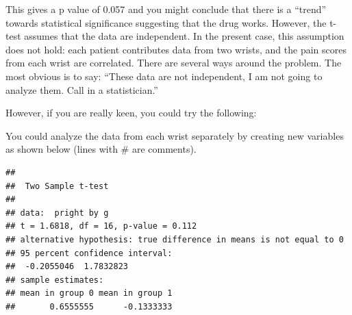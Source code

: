 \documentclass[]{book}
\newenvironment{Shaded}{\begin{snugshade}}{\end{snugshade}}
\newcommand{\CommentTok}[1]{\textcolor[rgb]{0.56,0.35,0.01}{\textit{#1}}}
\newcommand{\DataTypeTok}[1]{\textcolor[rgb]{0.13,0.29,0.53}{#1}}
\newcommand{\DecValTok}[1]{\textcolor[rgb]{0.00,0.00,0.81}{#1}}
\newcommand{\KeywordTok}[1]{\textcolor[rgb]{0.13,0.29,0.53}{\textbf{#1}}}
\newcommand{\NormalTok}[1]{#1}
\newcommand{\OperatorTok}[1]{\textcolor[rgb]{0.81,0.36,0.00}{\textbf{#1}}}
\newcommand{\OtherTok}[1]{\textcolor[rgb]{0.56,0.35,0.01}{#1}}
\newcommand{\StringTok}[1]{\textcolor[rgb]{0.31,0.60,0.02}{#1}}
\begin{document}
This gives a p value of 0.057 and you might conclude that there is a
``trend'' towards statistical significance suggesting that the drug
works. However, the t-test assumes that the data are independent. In the
present case, this assumption does not hold: each patient contributes
data from two wrists, and the pain scores from each wrist are
correlated. There are several ways around the problem. The most obvious
is to say: ``These data are not independent, I am not going to analyze
them. Call in a statistician.''

However, if you are really keen, you could try the following:

You could analyze the data from each wrist separately by creating new
variables as shown below (lines with \# are comments).

\begin{Shaded}
\end{Shaded}

\begin{verbatim}
## 
##  Two Sample t-test
## 
## data:  pright by g
## t = 1.6818, df = 16, p-value = 0.112
## alternative hypothesis: true difference in means is not equal to 0
## 95 percent confidence interval:
##  -0.2055046  1.7832823
## sample estimates:
## mean in group 0 mean in group 1 
##       0.6555555      -0.1333333
\end{verbatim}
\end{document}
